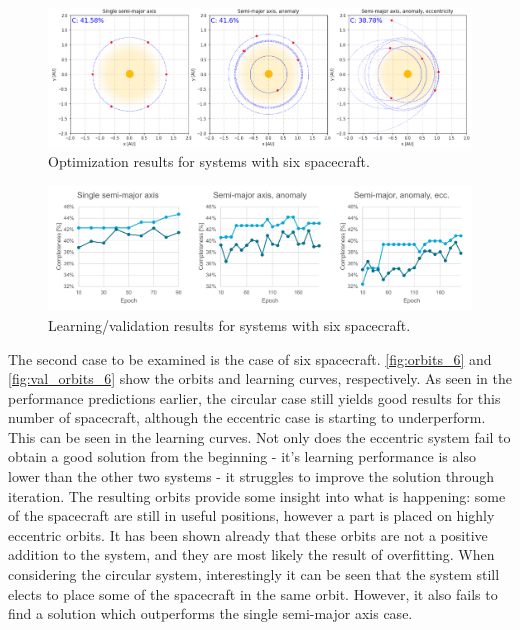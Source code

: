 \begin{figure}[htbp]
 \centering
 \includegraphics[width=1.0\textwidth]{img/orbits_6.png}
 \caption{Optimization results for systems with six spacecraft.}
 \label{fig:orbits_6}
\end{figure}
\begin{figure}[htbp]
 \centering
 \includegraphics[width=1.0\textwidth]{img/val_orbits_6.pdf}
 \caption{Learning/validation results for systems with six spacecraft.}
 \label{fig:val_orbits_6}
\end{figure}

The second case to be examined is the case of six spacecraft. \autoref{fig:orbits_6} and \autoref{fig:val_orbits_6} show the orbits and learning curves, respectively. As seen in the performance predictions earlier, the circular case still yields good results for this number of spacecraft, although the eccentric case is starting to underperform. This can be seen in the learning curves. Not only does the eccentric system fail to obtain a good solution from the beginning - it's learning performance is also lower than the other two systems - it struggles to improve the solution through iteration. The resulting orbits provide some insight into what is happening: some of the spacecraft are still in useful positions, however a part is placed on highly eccentric orbits. It has been shown already that these orbits are not a positive addition to the system, and they are most likely the result of overfitting. When considering the circular system, interestingly it can be seen that the system still elects to place some of the spacecraft in the same orbit. However, it also fails to find a solution which outperforms the single semi-major axis case. \\

